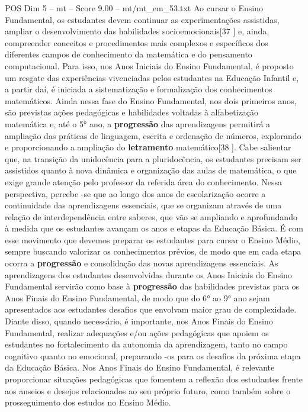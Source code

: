 \begin{textsample}{POS Dim 5 – mt – Score 9.00 – mt/mt\_em\_53.txt}
Ao cursar o Ensino Fundamental, os estudantes devem continuar as experimentações assistidas, ampliar o desenvolvimento das habilidades socioemocionais[37 ] e, ainda, compreender conceitos e procedimentos mais complexos e específicos dos diferentes campos de conhecimento da matemática e do pensamento computacional.
Para isso, nos Anos Iniciais do Ensino Fundamental, é proposto um resgate das experiências vivenciadas pelos estudantes na Educação Infantil e, a partir daí, é iniciada a sistematização e formalização dos conhecimentos matemáticos.
Ainda nessa fase do Ensino Fundamental, nos dois primeiros anos, são previstas ações pedagógicas e habilidades voltadas à alfabetização matemática e, até o 5{\EmojiFont °} ano, a \textbf{progressão} das aprendizagens permitirá a ampliação das práticas de linguagem, escrita e ordenação de números, explorando e proporcionando a ampliação do \textbf{letramento} matemático[38 ].
Cabe salientar que, na transição da unidocência para a pluridocência, os estudantes precisam ser assistidos quanto à nova dinâmica e organização das aulas de matemática, o que exige grande atenção pelo professor da referida área do conhecimento.
Nessa perspectiva, percebe -se que ao longo dos anos de escolarização ocorre a continuidade das aprendizagens essenciais, que se organizam através de uma relação de interdependência entre saberes, que vão se ampliando e aprofundando à medida que os estudantes avançam os anos e etapas da Educação Básica.
É com esse movimento que devemos preparar os estudantes para cursar o Ensino Médio, sempre buscando valorizar os conhecimentos prévios, de modo que em cada etapa ocorra a \textbf{progressão} e consolidação das novas aprendizagens essenciais.
As aprendizagens dos estudantes desenvolvidas durante os Anos Iniciais do Ensino Fundamental servirão como base à \textbf{progressão} das habilidades previstas para os Anos Finais do Ensino Fundamental, de modo que do 6{\EmojiFont °} ao 9{\EmojiFont °} ano sejam apresentados aos estudantes desafios que envolvam maior grau de complexidade.
Diante disso, quando necessário, é importante, nos Anos Finais do Ensino Fundamental, realizar adequações e/ou ações pedagógicas que apoiem os estudantes no fortalecimento da autonomia da aprendizagem, tanto no campo cognitivo quanto no emocional, preparando -os para os desafios da próxima etapa da Educação Básica.
Nos Anos Finais do Ensino Fundamental, é relevante proporcionar situações pedagógicas que fomentem a reflexão dos estudantes frente aos anseios e desejos relacionados ao seu próprio futuro, como também sobre o prosseguimento dos estudos no Ensino Médio.

\end{textsample}

